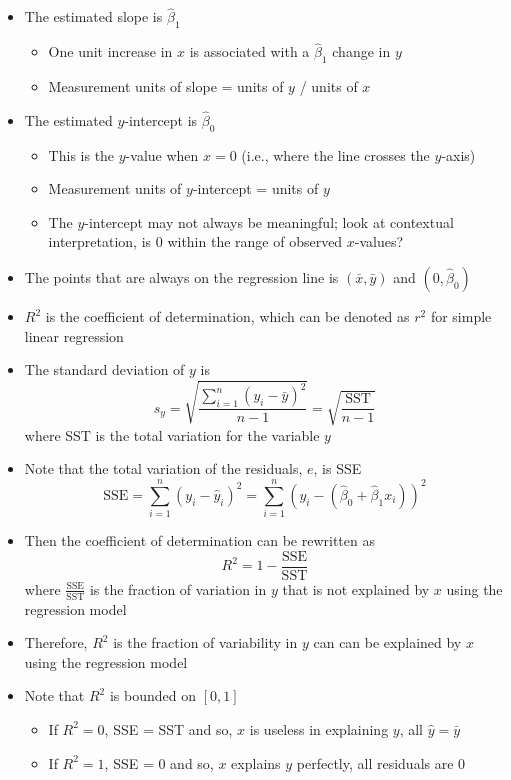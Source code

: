 \documentclass[12pt]{article}
\begin{document}
\begin{itemize}
\item The estimated slope is $\hat{\beta}_1$ \begin{itemize} 
\item One unit increase in $x$ is associated with a $\hat{\beta}_1$ change in $y$
\item Measurement units of slope = units of $y$ / units of $x$ \end{itemize} 
\item The estimated $y$-intercept is $\hat{\beta}_0$ \begin{itemize} 
\item This is the $y$-value when $x=0$ (i.e., where the line crosses the $y$-axis)
\item Measurement units of $y$-intercept = units of $y$ 
\item The $y$-intercept may not always be meaningful; look at contextual interpretation, is $0$ within the range of observed $x$-values? \end{itemize} 
\item The points that are always on the regression line is $(\bar{x}, \bar{y})$ and $(0, \hat{\beta}_0)$ 
\item $R^2$ is the coefficient of determination, which can be denoted as $r^2$ for simple linear regression 
\item The standard deviation of $y$ is $$ s_y = \sqrt{ \frac{\sum_{i=1}^n (y_i - \bar{y})^2}{n-1}} = \sqrt{\frac{\text{SST}}{n-1}} $$ where SST is the total variation for the variable $y$ 
\item Note that the total variation of the residuals, $e$, is SSE 
$$ \text{SSE} = \sum_{i=1}^n (y_i - \hat{y}_i)^2 = \sum_{i=1}^n \left(y_i - (\hat{\beta}_0 + \hat{\beta}_1x_i)\right)^2 $$ 
\item Then the coefficient of determination can be rewritten as $$ R^2 = 1 - \frac{\text{SSE}}{\text{SST}} $$ where $\frac{\text{SSE}}{\text{SST}}$ is the fraction of variation in $y$ that is not explained by $x$ using the regression model 
\item Therefore, $R^2$ is the fraction of variability in $y$ can can be explained by $x$ using the regression model
\item Note that $R^2$ is bounded on $[0,1]$ \begin{itemize} 
\item If $R^2 = 0$, SSE = SST and so, $x$ is useless in explaining $y$, all $\hat{y} = \bar{y}$ 
\item If $R^2 = 1$, SSE = $0$ and so, $x$ explains $y$ perfectly, all residuals are $0$ \end{itemize} 

\end{itemize}
\end{document}
